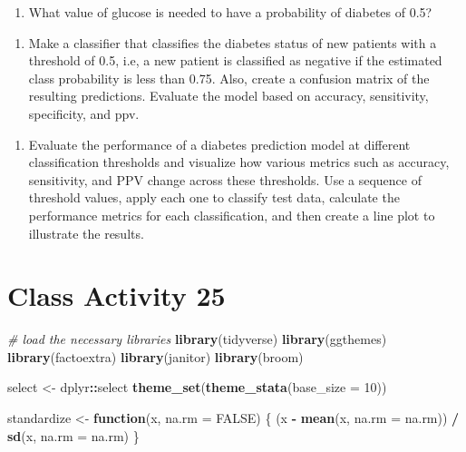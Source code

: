 \documentclass[
]{book}
\newenvironment{Shaded}{\begin{snugshade}}{\end{snugshade}}
\newcommand{\AttributeTok}[1]{\textcolor[rgb]{0.13,0.29,0.53}{#1}}
\newcommand{\CommentTok}[1]{\textcolor[rgb]{0.56,0.35,0.01}{\textit{#1}}}
\newcommand{\ConstantTok}[1]{\textcolor[rgb]{0.56,0.35,0.01}{#1}}
\newcommand{\ControlFlowTok}[1]{\textcolor[rgb]{0.13,0.29,0.53}{\textbf{#1}}}
\newcommand{\DecValTok}[1]{\textcolor[rgb]{0.00,0.00,0.81}{#1}}
\newcommand{\FunctionTok}[1]{\textcolor[rgb]{0.13,0.29,0.53}{\textbf{#1}}}
\newcommand{\NormalTok}[1]{#1}
\newcommand{\OtherTok}[1]{\textcolor[rgb]{0.56,0.35,0.01}{#1}}
\newcommand{\SpecialCharTok}[1]{\textcolor[rgb]{0.81,0.36,0.00}{\textbf{#1}}}
\providecommand{\tightlist}{%
  \setlength{\itemsep}{0pt}\setlength{\parskip}{0pt}}
\begin{document}
\begin{enumerate}
\def\labelenumi{\alph{enumi}.}
\setcounter{enumi}{2}
\tightlist
\item
  What value of glucose is needed to have a probability of diabetes of 0.5?
\end{enumerate}

\begin{enumerate}
\def\labelenumi{\alph{enumi}.}
\setcounter{enumi}{3}
\tightlist
\item
  Make a classifier that classifies the diabetes status of new patients with a threshold of 0.5, i.e, a new patient is classified as negative if the estimated class probability is less than 0.75. Also, create a confusion matrix of the resulting predictions. Evaluate the model based on accuracy, sensitivity, specificity, and ppv.
\end{enumerate}

\begin{enumerate}
\def\labelenumi{\alph{enumi}.}
\setcounter{enumi}{4}
\tightlist
\item
  Evaluate the performance of a diabetes prediction model at different classification thresholds and visualize how various metrics such as accuracy, sensitivity, and PPV change across these thresholds. Use a sequence of threshold values, apply each one to classify test data, calculate the performance metrics for each classification, and then create a line plot to illustrate the results.
\end{enumerate}

\hypertarget{class-activity-25}{%
\chapter{Class Activity 25}\label{class-activity-25}}

\begin{Shaded}
\begin{Highlighting}[]
\CommentTok{\# load the necessary libraries}
\FunctionTok{library}\NormalTok{(tidyverse) }
\FunctionTok{library}\NormalTok{(ggthemes)}
\FunctionTok{library}\NormalTok{(factoextra)}
\FunctionTok{library}\NormalTok{(janitor)}
\FunctionTok{library}\NormalTok{(broom)}

\NormalTok{select }\OtherTok{\textless{}{-}}\NormalTok{ dplyr}\SpecialCharTok{::}\NormalTok{select}
\FunctionTok{theme\_set}\NormalTok{(}\FunctionTok{theme\_stata}\NormalTok{(}\AttributeTok{base\_size =} \DecValTok{10}\NormalTok{))}


\NormalTok{standardize }\OtherTok{\textless{}{-}} \ControlFlowTok{function}\NormalTok{(x, }\AttributeTok{na.rm =} \ConstantTok{FALSE}\NormalTok{) \{}
\NormalTok{  (x }\SpecialCharTok{{-}} \FunctionTok{mean}\NormalTok{(x, }\AttributeTok{na.rm =}\NormalTok{ na.rm)) }\SpecialCharTok{/} \FunctionTok{sd}\NormalTok{(x, }\AttributeTok{na.rm =}\NormalTok{ na.rm)}
\NormalTok{\}}
\end{Highlighting}
\end{Shaded}
\end{document}

